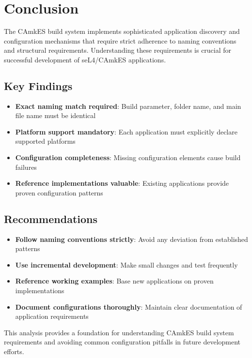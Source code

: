\documentclass[12pt,a4paper]{article}
\begin{document}
\section{Conclusion}

The CAmkES build system implements sophisticated application discovery and configuration mechanisms that require strict adherence to naming conventions and structural requirements. Understanding these requirements is crucial for successful development of seL4/CAmkES applications.

\subsection{Key Findings}

\begin{itemize}
\item \textbf{Exact naming match required}: Build parameter, folder name, and main file name must be identical
\item \textbf{Platform support mandatory}: Each application must explicitly declare supported platforms
\item \textbf{Configuration completeness}: Missing configuration elements cause build failures
\item \textbf{Reference implementations valuable}: Existing applications provide proven configuration patterns
\end{itemize}

\subsection{Recommendations}

\begin{itemize}
\item \textbf{Follow naming conventions strictly}: Avoid any deviation from established patterns
\item \textbf{Use incremental development}: Make small changes and test frequently
\item \textbf{Reference working examples}: Base new applications on proven implementations
\item \textbf{Document configurations thoroughly}: Maintain clear documentation of application requirements
\end{itemize}

This analysis provides a foundation for understanding CAmkES build system requirements and avoiding common configuration pitfalls in future development efforts.
\end{document}
